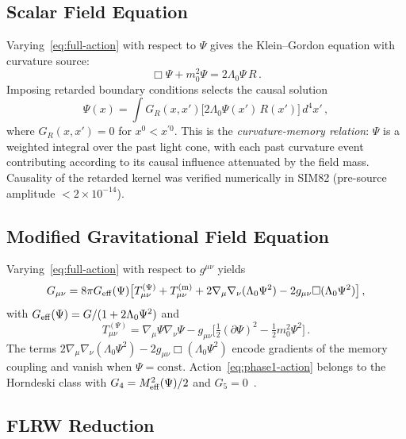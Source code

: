 \documentclass[12pt,a4paper]{article}
\newcommand{\Geff}{G_{\rm eff}}
\newcommand{\Lz}{\Lambda_0}
\begin{document}
\subsection{Scalar Field Equation}
\label{sec:scalar-eq}

Varying~\eqref{eq:full-action} with respect to $\Psi$ gives the Klein--Gordon
equation with curvature source:
\begin{equation}
  \Box\Psi + m_0^2\Psi = 2\Lz\Psi\,R\,.
  \label{eq:scalar-eom}
\end{equation}
Imposing retarded boundary conditions selects the causal solution
\begin{equation}
  \Psi(x) = \int G_R(x,x')\bigl[2\Lz\Psi(x')\,R(x')\bigr]\,d^4x'\,,
  \label{eq:memory}
\end{equation}
where $G_R(x,x') = 0$ for $x^0 < x^{\prime 0}$. This is the
\emph{curvature-memory relation}: $\Psi$ is a weighted integral over the
past light cone, with each past curvature event contributing according to
its causal influence attenuated by the field mass. Causality of the retarded
kernel was verified numerically in SIM82 (pre-source amplitude $< 2\times10^{-14}$).

\subsection{Modified Gravitational Field Equation}

Varying~\eqref{eq:full-action} with respect to $g^{\mu\nu}$ yields
\begin{equation}
  G_{\mu\nu} = 8\pi\Geff(\Psi)\bigl[
    T^{(\Psi)}_{\mu\nu} + T^{(\mathrm{m})}_{\mu\nu}
    + 2\nabla_\mu\nabla_\nu(\Lz\Psi^2)
    - 2g_{\mu\nu}\Box(\Lz\Psi^2)
  \bigr]\,,
  \label{eq:gravity}
\end{equation}
with $\Geff(\Psi) = G/(1 + 2\Lz\Psi^2)$ and
\begin{equation}
  T^{(\Psi)}_{\mu\nu} = \nabla_\mu\Psi\nabla_\nu\Psi
    - g_{\mu\nu}\bigl[\tfrac{1}{2}(\partial\Psi)^2 - \tfrac{1}{2}m_0^2\Psi^2\bigr]\,.
\end{equation}
The terms $2\nabla_\mu\nabla_\nu(\Lz\Psi^2) - 2g_{\mu\nu}\Box(\Lz\Psi^2)$
encode gradients of the memory coupling and vanish when $\Psi = \mathrm{const}$.
Action~\eqref{eq:phase1-action} belongs to the Horndeski class with
$G_4 = M_{\rm eff}^2(\Psi)/2$ and $G_5 = 0$~\cite{Kobayashi2011}.

\subsection{FLRW Reduction}
\label{sec:flrw}
\end{document}
